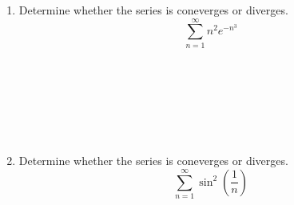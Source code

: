 \documentclass[12pt, a4paper]{article}
\begin{document}
\begin{enumerate}
    \item Determine whether the series is coneverges or diverges. 
    \[ \sum_{n=1}^{\infty} {n^2}{e^{-n^3}} \] \\ \\ \\ \\ \\ \\ 

    \item Determine whether the series is coneverges or diverges. 
    \[ \sum_{n=1}^{\infty} \sin^2{(\dfrac{1}{n})}\] 

\end{enumerate}
\end{document}
